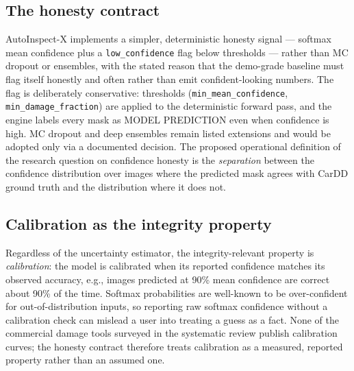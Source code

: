 \documentclass[conference]{IEEEtran}
\begin{document}
\subsection{The honesty contract}
AutoInspect-X implements a simpler, deterministic honesty signal --- softmax mean
confidence plus a \texttt{low\_confidence} flag below thresholds --- rather than
MC dropout or ensembles, with the stated reason that the demo-grade baseline must
flag itself honestly and often rather than emit confident-looking numbers. The
flag is deliberately conservative: thresholds (\texttt{min\_mean\_confidence},
\texttt{min\_damage\_fraction}) are applied to the deterministic forward pass,
and the engine labels every mask as MODEL PREDICTION even when confidence is
high. MC dropout and deep ensembles remain listed extensions and would be adopted
only via a documented decision. The proposed operational definition of the
research question on confidence honesty is the \emph{separation} between the
confidence distribution over images where the predicted mask agrees with CarDD
ground truth and the distribution where it does not.

\subsection{Calibration as the integrity property}
Regardless of the uncertainty estimator, the integrity-relevant property is
\emph{calibration}: the model is calibrated when its reported confidence matches
its observed accuracy, e.g., images predicted at 90\% mean confidence are correct
about 90\% of the time. Softmax probabilities are well-known to be
over-confident for out-of-distribution inputs, so reporting raw softmax confidence
without a calibration check can mislead a user into treating a guess as a fact.
None of the commercial damage tools surveyed in the systematic review
\cite{hasan2025} publish calibration curves; the honesty contract therefore treats
calibration as a measured, reported property rather than an assumed one.
\end{document}
